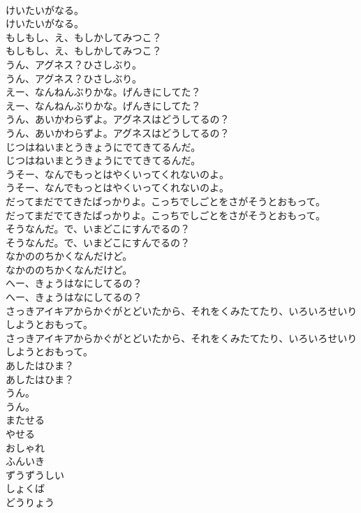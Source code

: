 \documentclass[8pt]{extreport}
\begin{document}
\begin{CJK}{UTF8}{min}
\\	けいたいがなる。
\\	けいたいがなる。
\\	もしもし、え、もしかしてみつこ？
\\	もしもし、え、もしかしてみつこ？
\\	うん、アグネス？ひさしぶり。
\\	うん、アグネス？ひさしぶり。
\\	えー、なんねんぶりかな。げんきにしてた？
\\	えー、なんねんぶりかな。げんきにしてた？
\\	うん、あいかわらずよ。アグネスはどうしてるの？
\\	うん、あいかわらずよ。アグネスはどうしてるの？
\\	じつはねいまとうきょうにでてきてるんだ。
\\	じつはねいまとうきょうにでてきてるんだ。
\\	うそー、なんでもっとはやくいってくれないのよ。
\\	うそー、なんでもっとはやくいってくれないのよ。
\\	だってまだでてきたばっかりよ。こっちでしごとをさがそうとおもって。
\\	だってまだでてきたばっかりよ。こっちでしごとをさがそうとおもって。
\\	そうなんだ。で、いまどこにすんでるの？
\\	そうなんだ。で、いまどこにすんでるの？
\\	なかののちかくなんだけど。
\\	なかののちかくなんだけど。
\\	へー、きょうはなにしてるの？
\\	へー、きょうはなにしてるの？
\\	さっきアイキアからかぐがとどいたから、それをくみたてたり、いろいろせいりしようとおもって。
\\	さっきアイキアからかぐがとどいたから、それをくみたてたり、いろいろせいりしようとおもって。
\\	あしたはひま？
\\	あしたはひま？
\\	うん。
\\	うん。
\\	またせる
\\	やせる
\\	おしゃれ
\\	ふんいき
\\	ずうずうしい
\\	しょくば
\\	どうりょう

\end{CJK}
\end{document}
